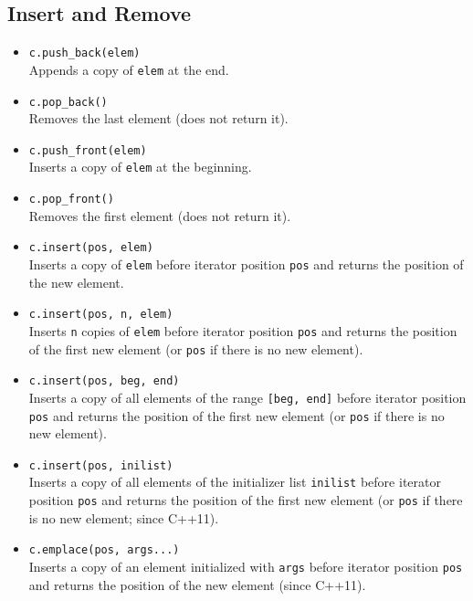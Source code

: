 \documentclass{report}
\begin{document}
\pagebreak 
\subsection{Insert and Remove}
\begin{itemize}
    \item \texttt{c.push\_back(elem)} \\
    Appends a copy of \texttt{elem} at the end.
    
    \item \texttt{c.pop\_back()} \\
    Removes the last element (does not return it).
    
    \item \texttt{c.push\_front(elem)} \\
    Inserts a copy of \texttt{elem} at the beginning.
    
    \item \texttt{c.pop\_front()} \\
    Removes the first element (does not return it).
    
    \item \texttt{c.insert(pos, elem)} \\
    Inserts a copy of \texttt{elem} before iterator position \texttt{pos} and returns the position of the new element.
    
    \item \texttt{c.insert(pos, n, elem)} \\
    Inserts \texttt{n} copies of \texttt{elem} before iterator position \texttt{pos} and returns the position of the first new element (or \texttt{pos} if there is no new element).
    
    \item \texttt{c.insert(pos, beg, end)} \\
    Inserts a copy of all elements of the range \texttt{[beg, end]} before iterator position \texttt{pos} and returns the position of the first new element (or \texttt{pos} if there is no new element).
    
    \item \texttt{c.insert(pos, inilist)} \\
    Inserts a copy of all elements of the initializer list \texttt{inilist} before iterator position \texttt{pos} and returns the position of the first new element (or \texttt{pos} if there is no new element; since C++11).
    
    \item \texttt{c.emplace(pos, args...)} \\
    Inserts a copy of an element initialized with \texttt{args} before iterator position \texttt{pos} and returns the position of the new element (since C++11).
    

\end{itemize}
\end{document}
